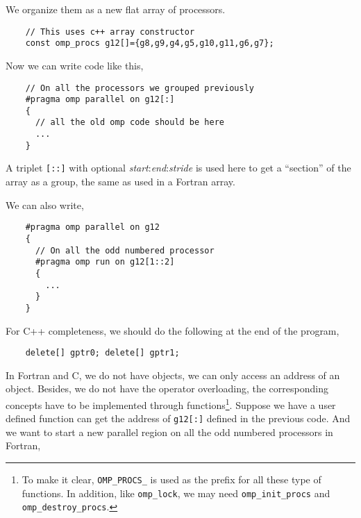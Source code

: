 We organize them as a new flat array of processors.

{\footnotesize
\begin{verbatim}
    // This uses c++ array constructor
    const omp_procs g12[]={g8,g9,g4,g5,g10,g11,g6,g7};
\end{verbatim}
}

Now we can write code like this,

{\footnotesize
\begin{verbatim}
    // On all the processors we grouped previously
    #pragma omp parallel on g12[:]
    {
      // all the old omp code should be here 
      ...
    }
\end{verbatim}
}

A triplet \texttt{[::]} with optional \emph{start}:\emph{end}:\emph{stride} is
used here to get a ``section'' of the array as a group, the same as used in a
Fortran array.

We can also write,

{\footnotesize
\begin{verbatim}
    #pragma omp parallel on g12
    {
      // On all the odd numbered processor
      #pragma omp run on g12[1::2] 
      {
        ...
      }
    }
\end{verbatim}
}

For C++ completeness, we should do the following at the end of the program,
 
{\footnotesize
\begin{verbatim}
    delete[] gptr0; delete[] gptr1;
\end{verbatim}
}

In Fortran and C, we do not have objects, we can only access an address of an
object. Besides, we do not have the operator overloading, the corresponding
concepts have to be implemented through functions\footnote{To make it clear,
\texttt{OMP\_PROCS\_} is used as the prefix for all these type of functions.
In addition, like \texttt{omp\_lock}, we may need \texttt{omp\_init\_procs} and
\texttt{omp\_destroy\_procs}.}. Suppose we have a user defined function can get
the address of \texttt{g12[:]} defined in the previous code.  And we want to
start a new parallel region on all the odd numbered processors in Fortran,

